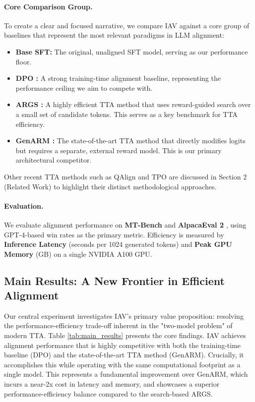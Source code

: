 \documentclass{article} %
\begin{document}
\paragraph{Core Comparison Group.}
To create a clear and focused narrative, we compare IAV against a core group of baselines that represent the most relevant paradigms in LLM alignment:
\begin{itemize}
    \item \textbf{Base SFT:} The original, unaligned SFT model, serving as our performance floor.
    \item \textbf{DPO \citep{rafailov2023direct}:} A strong training-time alignment baseline, representing the performance ceiling we aim to compete with.
    \item \textbf{ARGS \citep{khanov2024args}:} A highly efficient TTA method that uses reward-guided search over a small set of candidate tokens. This serves as a key benchmark for TTA efficiency.
    \item \textbf{GenARM \citep{xu2024genarm}:} The state-of-the-art TTA method that directly modifies logits but requires a separate, external reward model. This is our primary architectural competitor.
\end{itemize}
Other recent TTA methods such as QAlign and TPO are discussed in Section 2 (Related Work) to highlight their distinct methodological approaches.

\paragraph{Evaluation.}
We evaluate alignment performance on \textbf{MT-Bench} \citep{zheng2023judging} and \textbf{AlpacaEval 2} \citep{li2023alpacaeval}, using GPT-4-based win rates as the primary metric. Efficiency is measured by \textbf{Inference Latency} (seconds per 1024 generated tokens) and \textbf{Peak GPU Memory} (GB) on a single NVIDIA A100 GPU.

\subsection{Main Results: A New Frontier in Efficient Alignment}
Our central experiment investigates IAV's primary value proposition: resolving the performance-efficiency trade-off inherent in the "two-model problem" of modern TTA. Table \ref{tab:main_results} presents the core findings. IAV achieves alignment performance that is highly competitive with both the training-time baseline (DPO) and the state-of-the-art TTA method (GenARM). Crucially, it accomplishes this while operating with the same computational footprint as a single model. This represents a fundamental improvement over GenARM, which incurs a near-2x cost in latency and memory, and showcases a superior performance-efficiency balance compared to the search-based ARGS.
\end{document}
